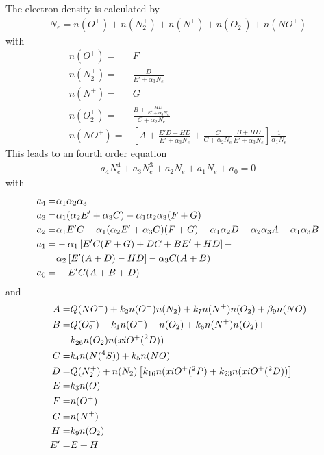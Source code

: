 The electron density is calculated by
%
\begin{align}
  N_e = n(O^+) + n(N_2^+) + n(N^+) + n(O_2^+)+ n(NO^+)
\end{align}
%
with
%
\begin{align}
  n(O^+) = & F \\
  n(N_2^+) = & \frac{D}{E' + \alpha_3 N_e} \\
  n(N^+) = & G \\
  n(O_2^+) = & \frac{B+\frac{HD}{E' + \alpha_3 N_e}}{C+ \alpha_2 N_e}
  \\
  n(NO^+) =&  \left[ A + \frac{E' D - HD}{E' + \alpha_3 N_e} + \frac{C}{C+ \alpha_2 N_e}
     \frac{B+HD}{E' + \alpha_3 N_e} \right] \frac{1}{\alpha_1 N_e}
\end{align}
%
 This leads to an
fourth order equation
%
\begin{align}
  a_4 N_e^4 + a_3 N_e^3 + a_2 N_e + a_1 N_e + a_0 = 0
\end{align}
%
with
%
\begin{align}
   a_4 = & \alpha_1 \alpha_2 \alpha_3 \\
   a_3 = & \alpha_1 (\alpha_2 E' + \alpha_3 C) - \alpha_1 \alpha_2
       \alpha_3 (F + G) \\
   a_2 = & \alpha_1 E' C - \alpha_1 (\alpha_2 E' + \alpha_3 C) (F+G)
        - \alpha_1 \alpha_2 D - \alpha_2 \alpha_3 A - \alpha_1
        \alpha_3 B \\
   a_1 = & - \alpha_1 \left[ E' C (F+G) + D C + B E' + H D\right] -
         \notag \\
        {} & \alpha_2 \left[ E' (A + D) - H D \right] - \alpha_3 C (A +
        B)\\
   a_0 =  & - E' C (A + B + D)
\end{align}
%
and
%
\begin{align}
  A = & Q(NO^+) + k_2 n(O^+)n(N_2) + k_7 n(N^+)n(O_2) + \beta_9
       n(NO)\\
  B = & Q(O_2^+)+ k_1 n(O^+)+ n(O_2) + k_6 n(N^+)n(O_2) + \notag \\
       {} & k_{26}n(O_2)n(xiO^+(^2D)) \\
  C = & k_4 n(N(^4S)) + k_5 n(NO) \\
  D = & Q(N_2^+) + n(N_2)\left[ k_{16}n(xiO^+(^2P) +
       k_{23}n(xiO^+(^2D))\right] \\
  E = & k_3 n(O) \\
  F = & n(O^+)  \\
  G = & n(N^+)  \\
  H = & k_9 n(O_2) \\
  E' = & E + H
\end{align}

